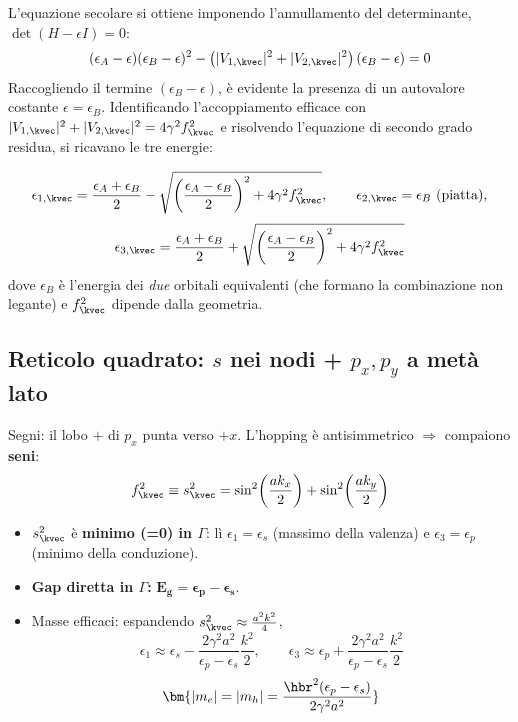 L'equazione secolare si ottiene imponendo l'annullamento del determinante, $\det(H - \epsilon I) = 0$:
\[ 
(\epsilon_A - \epsilon)(\epsilon_B - \epsilon)^2 - \left(|V_{1,\kvec}|^2 + |V_{2,\kvec}|^2\right)(\epsilon_B - \epsilon) = 0 
\]
Raccogliendo il termine $(\epsilon_B - \epsilon)$, è evidente la presenza di un autovalore costante $\epsilon = \epsilon_B$. Identificando l'accoppiamento efficace con $|V_{1,\kvec}|^2 + |V_{2,\kvec}|^2 = 4\gamma^2 f_\kvec^2$ e risolvendo l'equazione di secondo grado residua, si ricavano le tre energie:

\[ \epsilon_{1,\kvec} = \frac{\epsilon_A+\epsilon_B}{2}-\sqrt{\left(\frac{\epsilon_A-\epsilon_B}{2}\right)^2+4\gamma^2 f_\kvec^2},
   \qquad \epsilon_{2,\kvec}=\epsilon_B\ (\text{piatta}), \]
\[ \epsilon_{3,\kvec} = \frac{\epsilon_A+\epsilon_B}{2}+\sqrt{\left(\frac{\epsilon_A-\epsilon_B}{2}\right)^2+4\gamma^2 f_\kvec^2} \]
dove $\epsilon_B$ è l'energia dei \emph{due} orbitali equivalenti (che formano la combinazione non legante) e $f_\kvec^2$ dipende dalla geometria.

\subsection{Reticolo quadrato: $s$ nei nodi + $p_x, p_y$ a metà lato}
Segni: il lobo $+$ di $p_x$ punta verso $+x$. L'hopping è antisimmetrico $\Rightarrow$ compaiono \textbf{seni}:
\[ f_\kvec^2 \equiv s_\kvec^2 = \sin^2\!\left(\frac{ak_x}{2}\right)+\sin^2\!\left(\frac{ak_y}{2}\right) \]
\begin{itemize}
  \item $s_\kvec^2$ è \textbf{minimo (=0) in $\Gamma$}: lì $\epsilon_1 = \epsilon_s$ (massimo della valenza) e $\epsilon_3 = \epsilon_p$ (minimo della conduzione).
  \item \textbf{Gap diretta in $\Gamma$:} $\bm{E_g = \epsilon_p-\epsilon_s}$.
  \item Masse efficaci: espandendo $s^2_\kvec\approx \frac{a^2k^2}{4}$,
  \[ \epsilon_{1}\approx\epsilon_s - \frac{2\gamma^2a^2}{\epsilon_p-\epsilon_s}\frac{k^2}{2}, \qquad
     \epsilon_{3}\approx\epsilon_p + \frac{2\gamma^2a^2}{\epsilon_p-\epsilon_s}\frac{k^2}{2} \]
  \[ \bm{|m_e| = |m_h| = \frac{\hbr^2(\epsilon_p-\epsilon_s)}{2\gamma^2a^2}} \]
\end{itemize}

